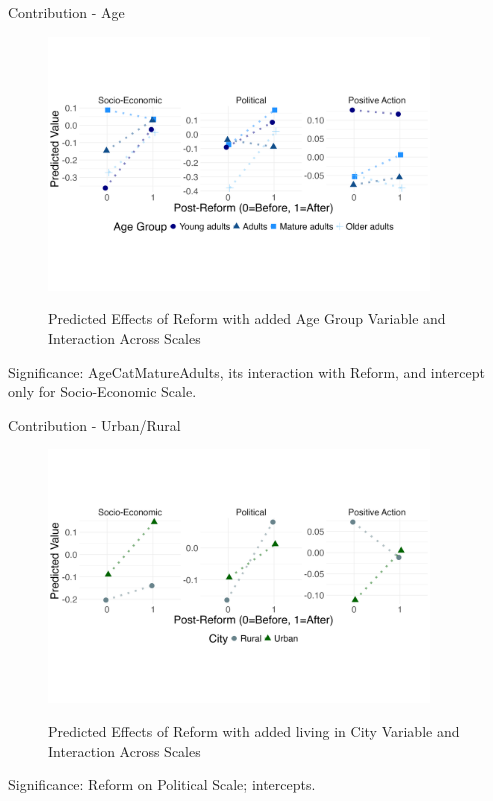 \documentclass{beamer}
\begin{document}
	
	\begin{frame}{Contribution - Age}
		
		\begin{figure}
			\centering
			\captionsetup{justification=centering, labelsep=period} 
			\caption{Predicted Effects of Reform with added Age Group Variable and Interaction Across Scales}
			\vspace*{-1cm}
			\includegraphics[width=0.9\textwidth]{age_plot}
			\label{fig:age_plot}
		\end{figure}
		\vspace{-1.5cm}	
		Significance: AgeCatMatureAdults, its interaction with Reform, and intercept only for Socio-Economic Scale. 
	\end{frame}
	
	\begin{frame}{Contribution - Urban/Rural}
		
		\begin{figure}
			\centering
			\captionsetup{justification=centering, labelsep=period} 
			\caption{Predicted Effects of Reform with added living in City Variable and Interaction Across Scales}
			\vspace*{-1cm}
			\includegraphics[width=0.9\textwidth]{city_plot}
			\label{fig:city_plot}
		\end{figure}
		\vspace{-1.5cm}	
		Significance: Reform on Political Scale; intercepts. 
	\end{frame}
	
\end{document}
